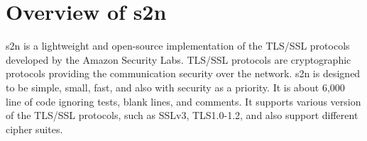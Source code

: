 

\section{Overview of s2n}
s2n \cite{3_the_s2n_user_manual} is a lightweight and open-source implementation of the TLS/SSL protocols developed by the Amazon Security Labs. TLS/SSL protocols are cryptographic protocols providing the communication security over the network. s2n is designed to be simple, small, fast, and also with security as a priority. It is about 6,000 line of code ignoring tests, blank lines, and comments. It supports various version of the TLS/SSL protocols, such as SSLv3, TLS1.0-1.2, and also support different cipher suites.  



